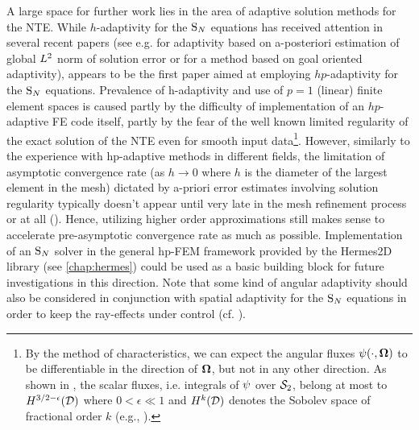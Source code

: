 \documentclass[twoside, 12pt]{thesis}
\begin{document}
A large space for further work lies in the area of adaptive solution methods for the NTE.  While $h$-adaptivity for the
$\SN$ equations has received attention in several recent papers (see e.g.
\cite{Fournier,Duo,ragusa2010two} for adaptivity based on a-posteriori estimation of global $\Lp[2]$ norm of solution
error or \cite{LathouwersGoal, Wang2} for a method based on goal oriented adaptivity), \cite{FournierDGHP} appears to
be the first paper aimed at employing $hp$-adaptivity for the $\SN$ equations.
Prevalence of h-adaptivity and use of $p=1$ (linear) finite element spaces is caused partly by the difficulty of implementation of an
$hp$-adaptive FE code itself, partly by the fear of the well known limited regularity of the exact solution of the NTE
even for smooth input data\footnote{By the method of characteristics, we can expect the angular fluxes
$\angflux(\cdot,\bomega)$ to be differentiable in the direction of $\bomega$, but not in any other direction. As shown
in \cite{Johnson}, the scalar fluxes, i.e. integrals of $\angflux$ over $\Sphere$, belong at most to
$H^{3/2-\epsilon}(\VV)$ where $0 < \epsilon \ll 1$ and $H^{k}(\VV)$ denotes the Sobolev space of fractional order $k$
(e.g., \cite[Sec. 9.2]{demkowicz}).}.
However, similarly to the experience with hp-adaptive methods in different fields, the limitation of asymptotic
convergence rate (as $h\to 0$ where $h$ is the diameter of the largest element in the mesh) dictated by a-priori error
estimates involving solution regularity typically doesn't appear until very late in the mesh refinement process or at
all (\cite{wang2009convergence}). Hence, utilizing higher order approximations still makes sense to accelerate
pre-asymptotic convergence rate as much as possible. Implementation of an $\SN$ solver in the general hp-FEM
framework provided by the Hermes2D library (see \cref{chap:hermes}) could be used as a basic building block for future
investigations in this direction. Note that some kind of angular adaptivity should also be considered in conjunction
with spatial adaptivity for the $\SN$ equations in order to keep the ray-effects under control (cf. ).

\appendix 
\makeatletter 
{}%
\makeatother
\renewcommand\thelemma{\thechapter.\arabic{lemma}} \renewcommand\theremark{\thechapter.\arabic{remark}}
\renewcommand\thecorollary{\thechapter.\arabic{corollary}}
\setcounter{theorem}{0}
\setcounter{lemma}{0}
\setcounter{remark}{0}
\setcounter{corollary}{0}
\end{document}

